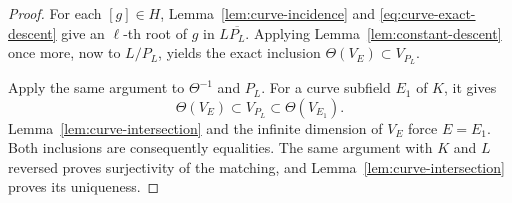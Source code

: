 \begin{proof}
For each $[g]\in H$, Lemma~\ref{lem:curve-incidence} and
\eqref{eq:curve-exact-descent} give an $\ell$-th root of $g$ in
$L\overline{P_L}$.  Applying Lemma~\ref{lem:constant-descent} once more,
now to $L/P_L$, yields the exact inclusion $\Theta(V_E)\subset V_{P_L}$.

Apply the same argument to $\Theta^{-1}$ and $P_L$.  For a curve
subfield $E_1$ of $K$, it gives
\[
                       \Theta(V_E)\subset V_{P_L}\subset\Theta(V_{E_1}).
\]
Lemma~\ref{lem:curve-intersection} and the infinite dimension of $V_E$
force $E=E_1$.  Both inclusions are consequently equalities.  The same
argument with $K$ and $L$ reversed proves surjectivity of the matching,
and Lemma~\ref{lem:curve-intersection} proves its uniqueness.
\end{proof}
